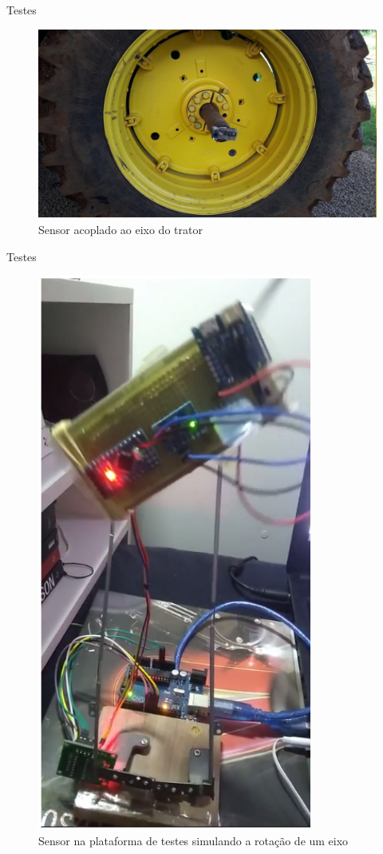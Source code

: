 \documentclass[12pt]{beamer}
\begin{document}
\begin{frame}{Testes}
    \begin{figure}[H]
    \centering
    \includegraphics[scale=.3]{testetrator.png}
    \caption{Sensor acoplado ao eixo do trator}
    \label{fig:testeCampo}
    \end{figure}
\end{frame}

\begin{frame}{Testes}
    \begin{figure}[H]
    \centering
    \includegraphics[scale=.35]{testesimulado.png}
    \caption{Sensor na plataforma de testes simulando a rotação de um eixo}
    \label{fig:testesimulado}
    \end{figure}
\end{frame}
\end{document}
